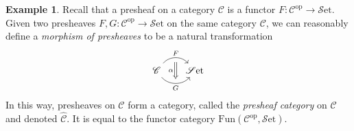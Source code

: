 \documentclass[10pt,oneside]{book}
\def\~#1{\mathscr{#1}}
\def\pre#1{\widehat{#1}}
\newcommand{\op}{\mathrm{op}}
\newcommand{\Fun}{\mathrm{Fun}}
\newcommand{\Set}{\~S\mathrm{et}}
\theoremstyle{plain}
\theoremstyle{definition}
\newtheorem{ex}[thm]{Example}
\theoremstyle{remark}
\numberwithin{equation}{section}
\numberwithin{figure}{section}
\begin{document}
\begin{ex}
    Recall that a presheaf on a category $\~C$ is a functor $F: \~C^\op \to \Set$. Given two presheaves $F, G: \~C^\op \to \Set$ on the same category $\~C$, we can reasonably define a \emph{morphism of presheaves} to be a natural transformation \[\begin{tikzcd}[column sep = scriptsize]
        {\~C} & \Set
        \arrow[""{name=0, anchor=center, inner sep=0}, "F", bend left=50, from=1-1, to=1-2]
        \arrow[""{name=1, anchor=center, inner sep=0}, "G"', bend right=50, from=1-1, to=1-2]
        \arrow["\alpha"', shorten <=4pt, shorten >=4pt, Rightarrow, from=0, to=1]
    \end{tikzcd}\]
    In this way, presheaves on $\~C$ form a category, called the \emph{presheaf category} on $\~C$ and denoted $\pre{\~C}$. It is equal to the functor category $\Fun(\~C^\op, \Set)$.  
\end{ex}
\end{document}
